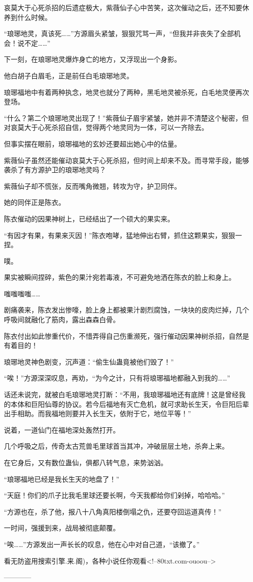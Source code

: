 \begin{this_body}
哀莫大于心死杀招的后遗症极大，紫薇仙子心中苦笑，这次催动之后，还不知要休养到什么时候。

“琅琊地灵，真该死……”方源眉头紧皱，狠狠咒骂一声，“但我并非丧失了全部机会！说不定……”

下一刻，在琅琊地灵爆炸身亡的地方，又浮现出一个身影。

他白胡子白眉毛，正是前任白毛琅琊地灵。

琅琊福地中有着两种执念，地灵也就分了两种，黑毛地灵被杀死，白毛地灵便再次登场。

“什么？第二个琅琊地灵出现了！”紫薇仙子眉宇紧皱，她并非不清楚这个秘密，但对哀莫大于心死杀招自信，觉得两个地灵同为一体，可以一齐除去。

但事实摆在眼前，琅琊福地的玄妙还要超出她心中的估量。

紫薇仙子虽然还能催动哀莫大于心死杀招，但时间上却来不及。而寻常手段，能够袭杀了有方源护卫的琅琊地灵吗？

紫薇仙子却不慌张，反而嘴角微翘，转攻为守，护卫同伴。

她的同伴正是陈衣。

陈衣催动的因果神树上，已经结出了一个硕大的果实来。

“有因才有果，有果来灭因！”陈衣咆哮，猛地伸出右臂，抓住这颗果实，狠狠一捏。

噗。

果实被瞬间捏碎，紫色的果汁宛若毒液，不可避免地洒在陈衣的脸上和身上。

嗤嗤嗤嗤……

剧痛袭来，陈衣发出惨嚎，脸上身上都被果汁剧烈腐蚀，一块块的皮肉烂掉，几个呼吸间就融化了筋肉，露出森森白骨。

陈衣付出如此惨重代价，不惜弄得自己伤重濒死，强行催动因果神树杀招，自然是有着目的！

琅琊地灵神色剧变，沉声道：“偷生仙蛊竟被他们毁了！”

“唉！”方源深深叹息，再劝，“为今之计，只有将琅琊福地都融入到我的……”

话还未说完，就被白毛琅琊地灵打断：“不用，我琅琊福地还有底牌！这是曾经我的本体和巨阳仙尊的协议。若今后福地有灭亡危机，就可求助长生天，令巨阳后辈出手相助。而我福地则要并入长生天，依附于它，地位平等！”

说着，一道仙门在福地深处轰然打开。

几个呼吸之后，传奇太古荒兽毛里球首当其冲，冲破层层土地，杀奔上来。

在它身后，又有数位蛊仙，俱都八转气息，来势汹汹。

“琅琊福地已经是我长生天的地盘了！”

“天庭！你们的爪子比我毛里球还要长啊，今天我都给你们剁掉，哈哈哈。”

“方源也在，杀了他，报八十八角真阳楼倒塌之仇，还要夺回运道真传！”

一时间，强援到来，战局被彻底颠覆。

“唉……”方源发出一声长长的叹息，他在心中对自己道，“该撤了。”

看无防盗用搜索引擎.来.阁)，各种小说任你观看<!--80txt.com-ouoou-->

------------

\end{this_body}

